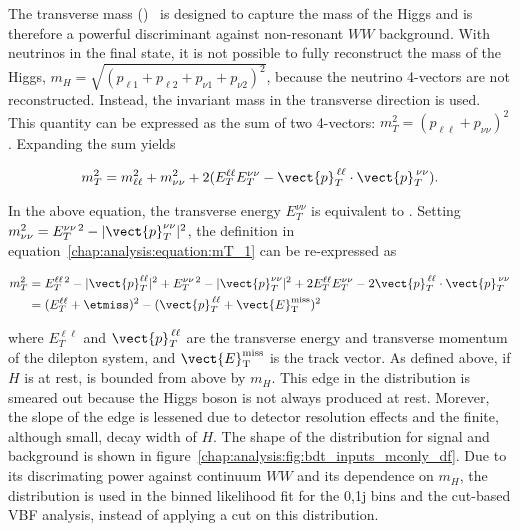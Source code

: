 The transverse mass (\mT)~\cite{bib:PhysRevD:43779,bib:Barr:2009mx} is
designed to capture the mass of the Higgs and is therefore a powerful
discriminant against non-resonant $WW$ background. With neutrinos in
the final state, it is not possible to fully reconstruct the mass of
the Higgs, $m_H = \sqrt{(p_{\ell 1} + p_{\ell 2} + p_{\nu 1} + p_{\nu
2})^2}$, because the neutrino 4-vectors are not reconstructed. Instead,
the invariant mass in the transverse direction is used. This quantity
can be expressed as the sum of two 4-vectors: $m_T^2 = (p_{\ell\ell} +
p_{\nu\nu})^2$. Expanding the sum yields

\begin{equation}
\label{chap:analysis:equation:mT_1}
m_T^2 = m_{\ell\ell}^2 + m_{\nu\nu}^2 +
2(E_{T}^{\ell\ell}E_{T}^{\nu\nu}-\vect{p}_T^{\,\ell\ell}\cdot\vect{p}_T^{\,\nu\nu}).
\end{equation}

\noindent In the above equation, the transverse energy $E_{T}^{\nu\nu}$
is equivalent to \etmiss. Setting $m_{\nu\nu}^2 = E_{T}^{\nu\nu\,2} -
|\vect{p}_T^{\nu\nu}|^2$, the definition in
equation~\ref{chap:analysis:equation:mT_1} can be re-expressed as

\begin{equation}
\begin{aligned}
\label{chap:analysis:equation:mT_2}
m_T^2 & = E_{T}^{\ell\ell\,2} - |\vect{p}_T^{\ell\ell}|^2 +
E_{T}^{\nu\nu\,2} - |\vect{p}_T^{\nu\nu}|^2 +
2E_{T}^{\ell\ell}E_{T}^{\nu\nu} -
2\vect{p}_T^{\,\ell\ell}\cdot\vect{p}_T^{\,\nu\nu} \\
& = (E_{T}^{\ell\ell} + \etmiss)^2 - (\vect{p}_T^{\,\ell\ell} +
\vect{E}_{\mathrm{T}}^{\rm miss})^2
\end{aligned}
\end{equation}

\noindent
where $E_{T}^{\ell\ell}$ and $\vect{p}_T^{\,\ell\ell}$ are the transverse
energy and transverse momentum of the dilepton system,
and $\vect{E}_{\mathrm{T}}^{\rm miss}$ is the track \etmiss vector. As defined
above, if $H$ is at rest, \mT is bounded from above by $m_H$. This
edge in the distribution is smeared out because the Higgs boson is not
always produced at rest. Morever, the slope of the edge is lessened due to
detector resolution effects and the finite, although small, decay
width of $H$. The shape of the distribution for signal and background
is shown in figure~\ref{chap:analysis:fig:bdt_inputs_mconly_df}. Due to its discrimating power against
continuum $WW$ and its dependence on $m_H$, the \mT distribution is
used in the binned likelihood fit for the 0,1j bins and the cut-based VBF
analysis, instead of applying a cut on this distribution. 

